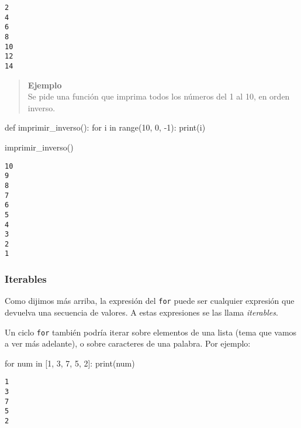 \documentclass[
  letterpaper,
  DIV=11,
  numbers=noendperiod]{scrreprt}
\newenvironment{Shaded}{\begin{snugshade}}{\end{snugshade}}
\newcommand{\BuiltInTok}[1]{\textcolor[rgb]{0.00,0.23,0.31}{#1}}
\newcommand{\ControlFlowTok}[1]{\textcolor[rgb]{0.00,0.23,0.31}{#1}}
\newcommand{\DecValTok}[1]{\textcolor[rgb]{0.68,0.00,0.00}{#1}}
\newcommand{\KeywordTok}[1]{\textcolor[rgb]{0.00,0.23,0.31}{#1}}
\newcommand{\NormalTok}[1]{\textcolor[rgb]{0.00,0.23,0.31}{#1}}
\newcommand{\OperatorTok}[1]{\textcolor[rgb]{0.37,0.37,0.37}{#1}}
\begin{document}
\begin{verbatim}
2
4
6
8
10
12
14
\end{verbatim}

\hfill\break

\begin{quote}
\textbf{Ejemplo}\\
Se pide una función que imprima todos los números del 1 al 10, en orden
inverso.
\end{quote}

\begin{Shaded}
\begin{Highlighting}[]
\KeywordTok{def}\NormalTok{ imprimir\_inverso():}
  \ControlFlowTok{for}\NormalTok{ i }\KeywordTok{in} \BuiltInTok{range}\NormalTok{(}\DecValTok{10}\NormalTok{, }\DecValTok{0}\NormalTok{, }\OperatorTok{{-}}\DecValTok{1}\NormalTok{):}
      \BuiltInTok{print}\NormalTok{(i)}

\NormalTok{imprimir\_inverso()}
\end{Highlighting}
\end{Shaded}

\begin{verbatim}
10
9
8
7
6
5
4
3
2
1
\end{verbatim}

\hfill\break

\subsubsection{Iterables}\label{iterables}

Como dijimos más arriba, la expresión del \texttt{for} puede ser
cualquier expresión que devuelva una secuencia de valores. A estas
expresiones se las llama \emph{iterables}.

Un ciclo \texttt{for} también podría iterar sobre elementos de una lista
(tema que vamos a ver más adelante), o sobre caracteres de una palabra.
Por ejemplo:

\begin{Shaded}
\begin{Highlighting}[]
\ControlFlowTok{for}\NormalTok{ num }\KeywordTok{in}\NormalTok{ [}\DecValTok{1}\NormalTok{, }\DecValTok{3}\NormalTok{, }\DecValTok{7}\NormalTok{, }\DecValTok{5}\NormalTok{, }\DecValTok{2}\NormalTok{]:}
    \BuiltInTok{print}\NormalTok{(num)}
\end{Highlighting}
\end{Shaded}

\begin{verbatim}
1
3
7
5
2
\end{verbatim}
\end{document}
